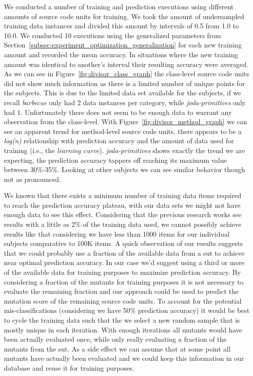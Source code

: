 We conducted a number of training and prediction executions using different amounts of source code units for training. We took the amount of undersampled training data instances and divided this amount by intervals of 0.5 from 1.0 to 10.0. We conducted 10 executions using the generalized parameters from Section~\ref{subsec:experiment_optimization_generalization} for each new training amount and recorded the mean accuracy. In situations where the new training amount was identical to another's interval their resulting accuracy were averaged. As we can see in Figure~\ref{fig:divisor_class_graph} the class-level source code units did not show much information as there is a limited number of unique points for the subjects. This is due to the limited data set available for the subjects, if we recall \emph{barbecue} only had 2 data instances per category, while \emph{joda-primitives} only had 1. Unfortunately there does not seem to be enough data to warrant any observation from the class-level. With Figure~\ref{fig:divisor_method_graph} we can see an apparent trend for method-level source code units, there appears to be a \emph{log(n)} relationship with prediction accuracy and the amount of data used for training (i.e., the \emph{learning curve}). \emph{joda-primitives} shows exactly the trend we are expecting, the prediction accuracy tappers off reaching its maximum value between 30\%-35\%. Looking at other subjects we can see similar behavior though not as pronounced.

We known that there exists a minimum number of training data items required to reach the prediction accuracy plateau, with our data sets we might not have enough data to see this effect. Considering that the previous research works see results with a little as 2\% of the training data used, we cannot possibly achieve results like that considering we have less than 1000 items for our individual subjects comparative to 100K items. A quick observation of our results suggests that we could probably use a fraction of the available data from a \gls{sut} to achieve near optimal prediction accuracy. In our case we'd suggest using a third or more of the available data for training purposes to maximize prediction accuracy. By considering a fraction of the mutants for training purposes it is not necessary to evaluate the remaining fraction and our approach could be used to predict the mutation score of the remaining source code units. To account for the potential mis-classifications (considering we have 50\% prediction accuracy) it would be best to cycle the training data such that the we select a new random sample that is mostly unique in each iteration. With enough iterations all mutants would have been actually evaluated once, while only really evaluating a fraction of the mutants from the \gls{sut}. As a side effect we can assume that at some point all mutants have actually been evaluated and we could keep this information in our database and reuse it for training purposes.


